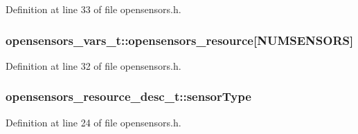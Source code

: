 Definition at line 33 of file opensensors.\+h.

\subsubsection[{\texorpdfstring{opensensors\+\_\+resource}{opensensors_resource}}]{ opensensors\+\_\+vars\+\_\+t\+::opensensors\+\_\+resource\mbox{[}{\bf N\+U\+M\+S\+E\+N\+S\+O\+RS}\mbox{]}}\hypertarget{group___open_sensors_gae5c6304a53cdd102b08b8c369fe4af73}{}\label{group___open_sensors_gae5c6304a53cdd102b08b8c369fe4af73}


Definition at line 32 of file opensensors.\+h.

\subsubsection[{\texorpdfstring{sensor\+Type}{sensorType}}]{ opensensors\+\_\+resource\+\_\+desc\+\_\+t\+::sensor\+Type}\hypertarget{group___open_sensors_gaf752996db289f7c2e59fccc591a2d07d}{}\label{group___open_sensors_gaf752996db289f7c2e59fccc591a2d07d}


Definition at line 24 of file opensensors.\+h.

